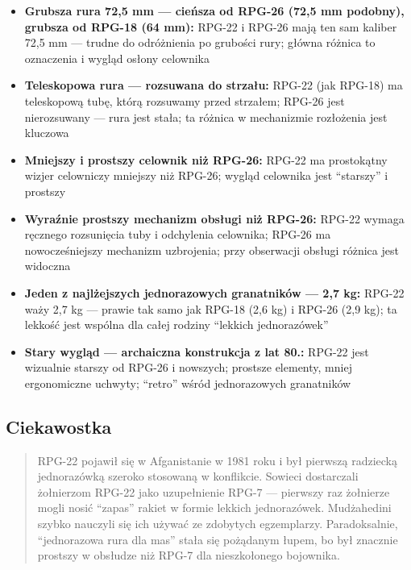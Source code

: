 \documentclass[12pt,oneside]{book}
\providecommand{\tightlist}{%
  \setlength{\itemsep}{0pt}\setlength{\parskip}{0pt}}
\begin{document}
\begin{itemize}
\tightlist
\item
  \textbf{Grubsza rura 72,5 mm --- cieńsza od RPG-26 (72,5 mm podobny),
  grubsza od RPG-18 (64 mm):} RPG-22 i RPG-26 mają ten sam kaliber 72,5
  mm --- trudne do odróżnienia po grubości rury; główna różnica to
  oznaczenia i wygląd osłony celownika
\item
  \textbf{Teleskopowa rura --- rozsuwana do strzału:} RPG-22 (jak
  RPG-18) ma teleskopową tubę, którą rozsuwamy przed strzałem; RPG-26
  jest nierozsuwany --- rura jest stała; ta różnica w mechanizmie
  rozłożenia jest kluczowa
\item
  \textbf{Mniejszy i prostszy celownik niż RPG-26:} RPG-22 ma
  prosto­kątny wizjer celowniczy mniejszy niż RPG-26; wygląd celownika
  jest ``starszy'' i prostszy
\item
  \textbf{Wyraźnie prostszy mechanizm obsługi niż RPG-26:} RPG-22 wymaga
  ręcznego rozsunięcia tuby i odchylenia celownika; RPG-26 ma
  nowocześniejszy mechanizm uzbrojenia; przy obserwacji obsługi różnica
  jest widoczna
\item
  \textbf{Jeden z najlżejszych jednorazowych granatników --- 2,7 kg:}
  RPG-22 waży 2,7 kg --- prawie tak samo jak RPG-18 (2,6 kg) i RPG-26
  (2,9 kg); ta lekkość jest wspólna dla całej rodziny ``lekkich
  jednorazówek''
\item
  \textbf{Stary wygląd --- archaiczna konstrukcja z lat 80.:} RPG-22
  jest wizualnie starszy od RPG-26 i nowszych; prostsze elementy, mniej
  ergonomiczne uchwyty; ``retro'' wśród jednorazowych granatników
\end{itemize}

\subsection{Ciekawostka}\label{ciekawostka-85}

\begin{quote}
RPG-22 pojawił się w Afganistanie w 1981 roku i był pierwszą radziecką
jednorazówką szeroko stosowaną w konflikcie. Sowieci dostarczali
żołnierzom RPG-22 jako uzupełnienie RPG-7 --- pierwszy raz żołnierze
mogli nosić ``zapas'' rakiet w formie lekkich jednorazówek. Mudżahedini
szybko nauczyli się ich używać ze zdobytych egzemplarzy. Paradoksalnie,
``jednorazowa rura dla mas'' stała się pożądanym łupem, bo był znacznie
prostszy w obsłudze niż RPG-7 dla nieszkołonego bojownika.
\end{quote}
\end{document}
